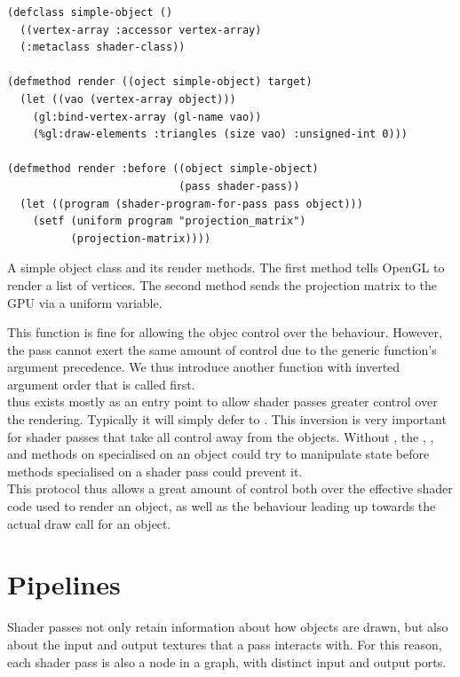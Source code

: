 \documentclass[format=sigconf]{acmart}
\begin{document}
\begin{listing}[h]
\begin{verbatim}
(defclass simple-object ()
  ((vertex-array :accessor vertex-array)
  (:metaclass shader-class))

(defmethod render ((oject simple-object) target)
  (let ((vao (vertex-array object)))
    (gl:bind-vertex-array (gl-name vao))
    (%gl:draw-elements :triangles (size vao) :unsigned-int 0)))

(defmethod render :before ((object simple-object)
                           (pass shader-pass))
  (let ((program (shader-program-for-pass pass object)))
    (setf (uniform program "projection_matrix")
          (projection-matrix))))
\end{verbatim}
\caption{A simple object class and its render methods. The first method tells OpenGL to render a list of vertices. The second method sends the projection matrix to the GPU via a uniform variable.}
\label{lst:simple-object}
\end{listing}

This function is fine for allowing the objec control over the behaviour. However, the pass cannot exert the same amount of control due to the generic function's argument precedence. We thus introduce another function with inverted argument order that is called first. \\

 thus exists mostly as an entry point to allow shader passes greater control over the rendering. Typically it will simply defer to . This inversion is very important for shader passes that take all control away from the objects. Without , the , , and  methods on  specialised on an object could try to manipulate state before methods specialised on a shader pass could prevent it. \\

This protocol thus allows a great amount of control both over the effective shader code used to render an object, as well as the behaviour leading up towards the actual draw call for an object.

\section{Pipelines}\label{pipelines}
Shader passes not only retain information about how objects are drawn, but also about the input and output textures that a pass interacts with. For this reason, each shader pass is also a node in a graph, with distinct input and output ports.
\end{document}
